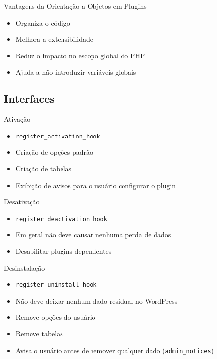 \documentclass{beamer}
\begin{document}
\begin{frame}{Vantagens da Orientação a Objetos em Plugins}
\begin{itemize}
  \pause \item Organiza o código
  \pause \item Melhora a extensibilidade
  \pause \item Reduz o impacto no escopo global do PHP
  \pause \item Ajuda a não introduzir variáveis globais
\end{itemize}
\end{frame}

\subsection{Interfaces}

\begin{frame}{Ativação}
\begin{itemize}
  \pause \item \texttt{register\_activation\_hook}
  \pause \item Criação de opções padrão
  \pause \item Criação de tabelas
  \pause \item Exibição de avisos para o usuário configurar o plugin
\end{itemize}
\end{frame}

\begin{frame}{Desativação}
\begin{itemize}
  \pause \item \texttt{register\_deactivation\_hook}
  \pause \item Em geral não deve causar nenhuma perda de dados
  \pause \item Desabilitar plugins dependentes
\end{itemize}
\end{frame}

\begin{frame}{Desinstalação}
\begin{itemize}
  \pause \item \texttt{register\_uninstall\_hook}
  \pause \item Não deve deixar nenhum dado residual no WordPress
  \pause \item Remove opções do usuário
  \pause \item Remove tabelas
  \pause \item Avisa o usuário antes de remover qualquer
    dado (\texttt{admin\_notices})
\end{itemize}
\end{frame}
\end{document}
